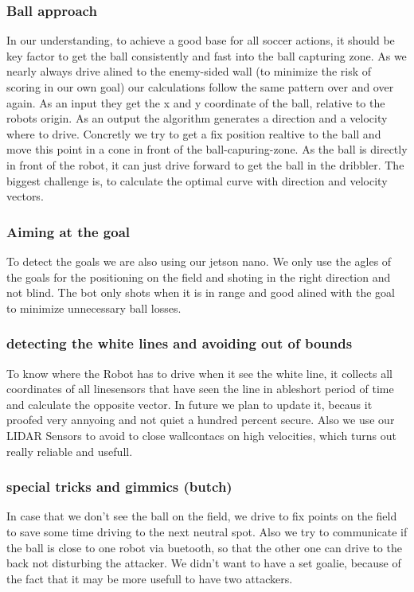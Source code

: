\documentclass{scrartcl}
\begin{document}
\subsubsection{Ball approach}
In our understanding, to achieve a good base for all soccer actions, it should be key factor to get the ball
consistently and fast into the ball capturing zone.
As we nearly always drive alined to the enemy-sided wall (to minimize the risk of scoring in our own goal) our
calculations follow the same pattern over and over again. As an input they get the x and y coordinate of the
ball, relative to the robots origin. As an output the algorithm generates a direction and a velocity where to drive.
Concretly we try to get a fix position realtive to the ball and move this point in a cone in front of the ball-capuring-zone.
As the ball is directly in front of the robot, it can just drive forward to get the ball in the dribbler. The biggest challenge is,
to calculate the optimal curve with direction and velocity vectors.
\subsubsection{Aiming at the goal}
To detect the goals we are also using our jetson nano. We only use the agles of the goals for the positioning on the field
and shoting in the right direction and not blind. The bot only shots when it is in range and good alined with the goal to minimize unnecessary ball losses.

\subsubsection{detecting the white lines and avoiding out of bounds}
To know where the Robot has to drive when it see the white line, it collects all coordinates of all linesensors that have seen the line in ableshort period of time
and calculate the opposite vector. In future we plan to update it, becaus it proofed very annyoing and not quiet a hundred percent secure.
Also we use our LIDAR Sensors to avoid to close wallcontacs on high velocities, which turns out really reliable and usefull.

\subsubsection{special tricks and gimmics (butch)}
In case that we don't see the ball on the field, we drive to fix points on the field to save some time driving to the next neutral spot.
Also we try to communicate if the ball is close to one robot via buetooth, so that the other one can drive to the back not disturbing the attacker.
We didn't want to have a set goalie, because of the fact that it may be more usefull to have two attackers.
\end{document}

